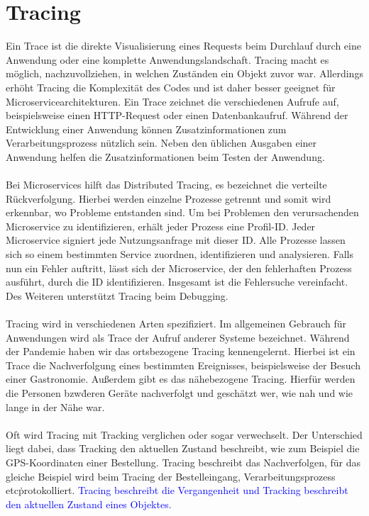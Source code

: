 \section{Tracing}\label{sec:tracing}
Ein Trace ist die direkte Visualisierung eines Requests beim Durchlauf durch eine Anwendung oder eine komplette Anwendungslandschaft.
Tracing macht es möglich, nachzuvollziehen, in welchen Zuständen ein Objekt zuvor war.
Allerdings erhöht Tracing die Komplexität des Codes und ist daher besser geeignet für Microservicearchitekturen.
Ein Trace zeichnet die verschiedenen Aufrufe auf, beispielsweise einen HTTP-Request oder einen Datenbankaufruf.
Während der Entwicklung einer Anwendung können Zusatzinformationen zum Verarbeitungsprozess nützlich sein.
Neben den üblichen Ausgaben einer Anwendung helfen die Zusatzinformationen beim Testen der Anwendung.\autocite{adesso}
\\
\\
Bei Microservices hilft das Distributed Tracing, es bezeichnet die verteilte Rückverfolgung.
Hierbei werden einzelne Prozesse getrennt und somit wird erkennbar, wo Probleme entstanden sind.
Um bei Problemen den verursachenden Microservice zu identifizieren, erhält jeder Prozess eine Profil-ID.
Jeder Microservice signiert jede Nutzungsanfrage mit dieser ID.
Alle Prozesse lassen sich so einem bestimmten Service zuordnen, identifizieren und analysieren.
Falls nun ein Fehler auftritt, lässt sich der Microservice, der den fehlerhaften Prozess ausführt, durch die ID identifizieren.
Insgesamt ist die Fehlersuche vereinfacht.
Des Weiteren unterstützt Tracing beim Debugging.\autocite{adesso,dotnet,dev-insider}
\\
\\
Tracing wird in verschiedenen Arten spezifiziert.
Im allgemeinen Gebrauch für Anwendungen wird als Trace der Aufruf anderer Systeme bezeichnet.
Während der Pandemie haben wir das ortsbezogene Tracing kennengelernt.
Hierbei ist ein Trace die Nachverfolgung eines bestimmten Ereignisses, beispielsweise der Besuch einer Gastronomie.
Außerdem gibt es das nähebezogene Tracing.
Hierfür werden die Personen bzw\. deren Geräte nachverfolgt und geschätzt wer, wie nah und wie lange in der Nähe war.\autocite{monstarlab}
\\
\\
Oft wird Tracing mit Tracking verglichen oder sogar verwechselt.
Der Unterschied liegt dabei, dass Tracking den aktuellen Zustand beschreibt, wie zum Beispiel die GPS-Koordinaten einer Bestellung.
Tracing beschreibt das Nachverfolgen, für das gleiche Beispiel wird beim Tracing der Bestelleingang, Verarbeitungsprozess etc\. protokolliert.
\textcolor{blue}{Tracing beschreibt die Vergangenheit und Tracking beschreibt den aktuellen Zustand eines Objektes.}\autocite{monstarlab}


